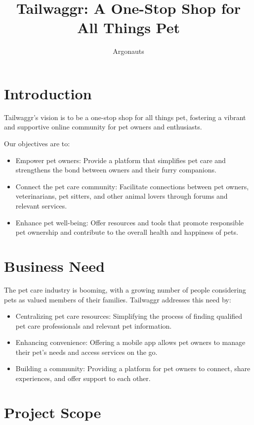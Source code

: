 \documentclass{article}
\title{Tailwaggr: A One-Stop Shop for All Things Pet}
\author{Argonauts}
\begin{document}
\maketitle

\section{Introduction}

Tailwaggr's vision is to be a one-stop shop for all things pet, fostering a vibrant and supportive online community for pet owners and enthusiasts.

Our objectives are to:

\begin{itemize}
\item Empower pet owners: Provide a platform that simplifies pet care and strengthens the bond between owners and their furry companions.
\item Connect the pet care community: Facilitate connections between pet owners, veterinarians, pet sitters, and other animal lovers through forums and relevant services.
\item Enhance pet well-being: Offer resources and tools that promote responsible pet ownership and contribute to the overall health and happiness of pets.
\end{itemize}

\section{Business Need}

The pet care industry is booming, with a growing number of people considering pets as valued members of their families.  Tailwaggr addresses this need by:

\begin{itemize}
\item Centralizing pet care resources: Simplifying the process of finding qualified pet care professionals and relevant pet information.
\item Enhancing convenience: Offering a mobile app allows pet owners to manage their pet's needs and access services on the go.
\item Building a community: Providing a platform for pet owners to connect, share experiences, and offer support to each other.
\end{itemize}

\section{Project Scope}
\end{document}
